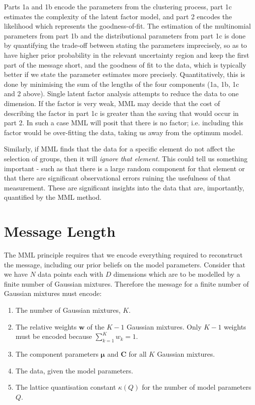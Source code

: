 \documentclass{elsarticle}
\newcommand{\vect}[1]{\boldsymbol{\mathbf{#1}}}
\def\veccov{\vect{C}}
\def\vecmean{\vect{\mu}}
\def\weight{w}
\def\weights{\vect{\weight}}
\begin{document}
\vspace{-1mm}

Parts 1a and 1b encode the parameters from the clustering process, part 1c  
estimates the complexity of the latent factor model, and part 2 encodes the likelihood 
which represents the goodness-of-fit. 
The estimation of the multinomial parameters from part 1b and the distributional parameters 
from part 1c is done by quantifying the trade-off between stating the parameters imprecisely, 
so as to have higher prior probability in the relevant uncertainty region and keep the first 
part of the message short, and the goodness of fit to the data, which is typically better 
if we state the parameter estimates more precisely. Quantitatively, this is done by 
minimising the sum of the lengths of the four components (1a, 1b, 1c and 2 above).
Single latent factor analysis attempts to reduce the data to one dimension. 
If the factor is very weak,  MML may decide that the cost 
of describing the factor in part 1c is greater than the saving that would occur 
in part 2. In such a case MML will 
posit that there is no factor; i.e. including this factor would be over-fitting 
the data, taking us away from the optimum model.


Similarly, if MML finds that 
the data for a specific element do not affect the selection %
of groups, then it will {\it ignore that element.\/} This could tell us something 
important - such as that there is a large random component for that element 
or that there are significant observational 
errors ruining the usefulness of that measurement. 
These are significant insights into the data that are, importantly, quantified by the MML method.


\section{Message Length}


The MML principle requires that we encode everything required to reconstruct 
the message, including our prior beliefs on the model parameters. Consider 
that we have $N$ data points each with $D$ dimensions which are to be 
modelled by a finite number of Gaussian mixtures. Therefore the message for 
a finite number of Gaussian mixtures must encode:

\begin{enumerate}
  \item The number of Gaussian mixtures, $K$.
  \item The relative weights $\weights$ of the $K - 1$ Gaussian mixtures. Only
        $K - 1$ weights must be encoded because $\sum_{k=1}^{K}\weight_k = 1$.
  \item The component parameters $\vecmean$ and $\veccov$ for all $K$ Gaussian
        mixtures.
  \item The data, given the model parameters.
  \item The lattice quantisation constant $\kappa(Q)$ for the number of model
        parameters $Q$.
\end{enumerate}
\end{document}
